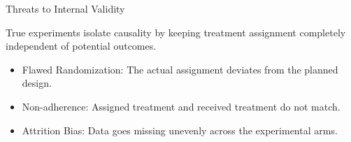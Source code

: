 \documentclass[11pt,aspectratio=169]{beamer}
\begin{document}
\begin{frame}{Threats to Internal Validity}

True experiments isolate causality by keeping treatment assignment completely independent of potential outcomes.


\begin{itemize}
  \item Flawed Randomization: The actual assignment deviates from the planned design.
  \item Non-adherence: Assigned treatment and received treatment do not match.
  \item Attrition Bias: Data goes missing unevenly across the experimental arms.
\end{itemize}

\end{frame}
\end{document}
